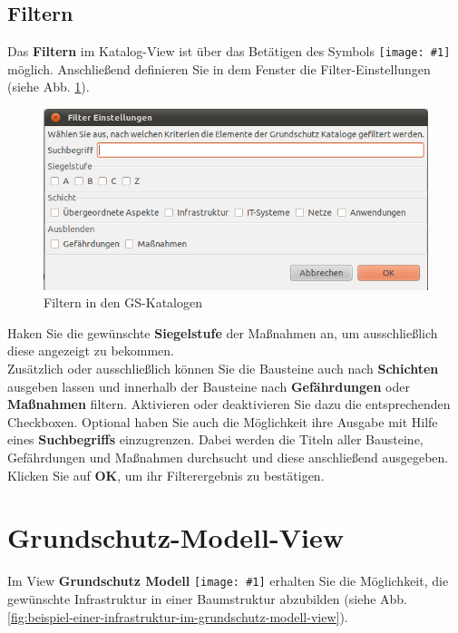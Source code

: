 \documentclass[a4paper,10pt]{book}
\newcommand{\icon}[1]{\texttt{[image: \#1]}}
\begin{document}
\subsection{Filtern}
Das \textbf{Filtern} im Katalog-View ist über das Betätigen des Symbols \icon{Icon/Filter.png} möglich.
Anschließend definieren Sie in dem Fenster die Filter-Einstellungen (siehe Abb. \ref{Filtern der GS-Kataloge}).
\newline
\begin{figure}[htb!]
  \centering
  \includegraphics[scale=.5]{Screenshot/Filtern_kataloge.png}
  \caption{\label{Filtern der GS-Kataloge} Filtern in den GS-Katalogen}
\end{figure}
\newline
Haken Sie die gewünschte \textbf{Siegelstufe} der Maßnahmen an, um ausschließlich diese angezeigt zu bekommen.
\newline\\
Zusätzlich oder ausschließlich können Sie die Bausteine auch nach \textbf{Schichten} ausgeben lassen und innerhalb der Bausteine nach \textbf{Gefährdungen}
oder \textbf{Maßnahmen} filtern. Aktivieren oder deaktivieren Sie dazu die entsprechenden Checkboxen. Optional haben Sie auch die Möglichkeit ihre
Ausgabe mit Hilfe eines \textbf{Suchbegriffs} einzugrenzen. Dabei werden die Titeln aller Bausteine, Gefährdungen und Maßnahmen durchsucht
und diese anschließend ausgegeben. Klicken Sie auf \textbf{OK}, um ihr Filterergebnis zu bestätigen.

\section{Grundschutz-Modell-View}

Im View \textbf{Grundschutz Modell}
\icon{Icon/GS_Modell.png} erhalten Sie die
Möglichkeit, die gewünschte Infrastruktur in einer Baumstruktur
abzubilden (siehe
Abb. \ref{fig:beispiel-einer-infrastruktur-im-grundschutz-modell-view}).
\end{document}
